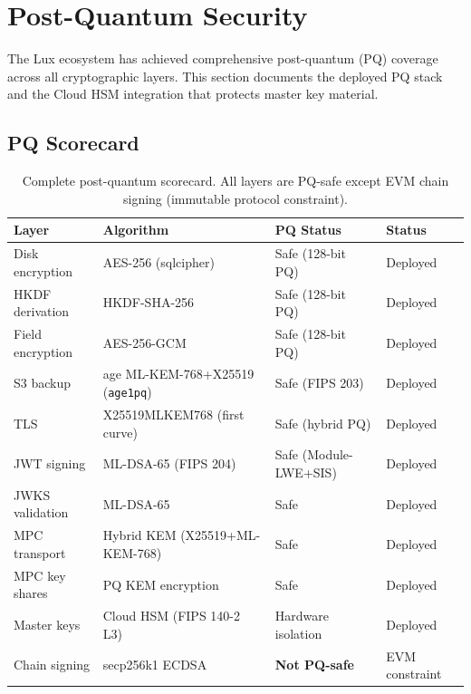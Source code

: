 \section{Post-Quantum Security}
\label{sec:pq}

The Lux ecosystem has achieved comprehensive post-quantum (PQ)
coverage across all cryptographic layers. This section documents the
deployed PQ stack and the Cloud HSM integration that protects master
key material.

\subsection{PQ Scorecard}

\begin{table}[H]
\centering
\caption{Complete post-quantum scorecard. All layers are PQ-safe
  except EVM chain signing (immutable protocol constraint).}
\label{tab:pq-scorecard}
\begin{tabular}{@{}llll@{}}
\toprule
\textbf{Layer} & \textbf{Algorithm} & \textbf{PQ Status} & \textbf{Status} \\
\midrule
Disk encryption     & AES-256 (sqlcipher)          & Safe (128-bit PQ)    & Deployed \\
HKDF derivation     & HKDF-SHA-256                 & Safe (128-bit PQ)    & Deployed \\
Field encryption    & AES-256-GCM                  & Safe (128-bit PQ)    & Deployed \\
S3 backup           & age ML-KEM-768+X25519 (\texttt{age1pq}) & Safe (FIPS 203) & Deployed \\
TLS                 & X25519MLKEM768 (first curve) & Safe (hybrid PQ)     & Deployed \\
JWT signing         & ML-DSA-65 (FIPS 204)         & Safe (Module-LWE+SIS)& Deployed \\
JWKS validation     & ML-DSA-65                    & Safe                 & Deployed \\
MPC transport       & Hybrid KEM (X25519+ML-KEM-768) & Safe              & Deployed \\
MPC key shares      & PQ KEM encryption            & Safe                 & Deployed \\
Master keys         & Cloud HSM (FIPS 140-2 L3)    & Hardware isolation   & Deployed \\
Chain signing       & secp256k1 ECDSA              & \textbf{Not PQ-safe} & EVM constraint \\
\bottomrule
\end{tabular}
\end{table}

